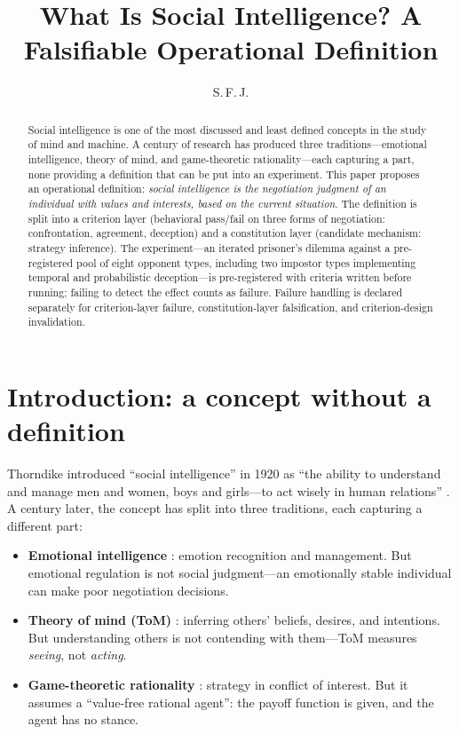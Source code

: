 \documentclass[11pt]{article}
\title{What Is Social Intelligence? A Falsifiable Operational Definition}
\author{S.\,F.\,J.}
\date{}
\begin{document}
\maketitle

\begin{abstract}
Social intelligence is one of the most discussed and least defined concepts in the study of mind and machine. A century of research has produced three traditions---emotional intelligence, theory of mind, and game-theoretic rationality---each capturing a part, none providing a definition that can be put into an experiment. This paper proposes an operational definition: \emph{social intelligence is the negotiation judgment of an individual with values and interests, based on the current situation}. The definition is split into a criterion layer (behavioral pass/fail on three forms of negotiation: confrontation, agreement, deception) and a constitution layer (candidate mechanism: strategy inference). The experiment---an iterated prisoner's dilemma against a pre-registered pool of eight opponent types, including two impostor types implementing temporal and probabilistic deception---is pre-registered with criteria written before running; failing to detect the effect counts as failure. Failure handling is declared separately for criterion-layer failure, constitution-layer falsification, and criterion-design invalidation.
\end{abstract}

\section{Introduction: a concept without a definition}
\label{sec:intro}

Thorndike introduced ``social intelligence'' in 1920 as ``the ability to understand and manage men and women, boys and girls---to act wisely in human relations'' \cite{thorndike1920}. A century later, the concept has split into three traditions, each capturing a different part:

\begin{itemize}
\item \textbf{Emotional intelligence} \cite{goleman1995}: emotion recognition and management. But emotional regulation is not social judgment---an emotionally stable individual can make poor negotiation decisions.
\item \textbf{Theory of mind (ToM)} \cite{premack1978}: inferring others' beliefs, desires, and intentions. But understanding others is not contending with them---ToM measures \emph{seeing}, not \emph{acting}.
\item \textbf{Game-theoretic rationality} \cite{axelrod1984}: strategy in conflict of interest. But it assumes a ``value-free rational agent'': the payoff function is given, and the agent has no stance.
\end{itemize}
\end{document}
